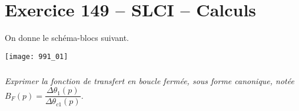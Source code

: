 \section*{Exercice 149 -- SLCI -- Calculs}
\setcounter{exo}{0}

On donne le schéma-blocs suivant.
\begin{center}
\texttt{[image: 991\_01]}
\end{center}


\subparagraph{}
\textit{Exprimer la fonction de transfert en boucle fermée, sous forme canonique, notée $B_F(p)=\dfrac{\Delta \theta_1(p)}{\Delta \theta_{c1}(p)}$.}
\ifprof
\begin{corrige}
\end{corrige}
\else
\fi

